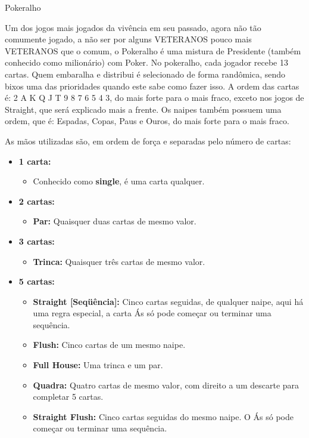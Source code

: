 \begin{subsecao}{Pokeralho}

Um dos jogos mais jogados da vivência em seu passado, agora não tão comumente
jogado, a não ser por alguns VETERANOS pouco mais VETERANOS que o comum, o
Pokeralho é uma mistura de Presidente (também conhecido como milionário) com
Poker. No pokeralho, cada jogador recebe 13 cartas. Quem embaralha e distribui é
selecionado de forma randômica, sendo bixos uma das prioridades quando este sabe
como fazer isso. A ordem das cartas é: 2 A K Q J T 9 8 7 6 5 4 3, do mais forte
para o mais fraco, exceto nos jogos de Straight, que será explicado mais a
frente. Os naipes também possuem uma ordem, que é: Espadas, Copas, Paus e Ouros,
do mais forte para o mais fraco.

As mãos utilizadas são, em ordem de força e separadas pelo número de cartas:
\begin{itemize}

\item \textbf {1 carta:}
\begin{itemize}
\item Conhecido como \textbf{single}, é uma carta qualquer.
\end{itemize}
\item \textbf {2 cartas:}
\begin{itemize}

\item \textbf{Par:} Quaisquer duas cartas de mesmo valor.
\end{itemize}
\item \textbf {3 cartas:}

\begin{itemize}
\item \textbf{Trinca:} Quaisquer três cartas de mesmo valor.
\end{itemize}
\item \textbf {5 cartas:}

\begin{itemize}
\item \textbf{Straight [Seqüência]:} Cinco cartas seguidas, de qualquer naipe,
aqui há uma regra especial, a carta Ás só pode começar ou terminar uma
sequência.
\item \textbf{Flush:} Cinco cartas de um mesmo naipe.
\item \textbf{Full House:} Uma trinca e um par.
\item \textbf{Quadra:} Quatro cartas de mesmo valor, com direito a um descarte
para completar 5 cartas.
\item \textbf{Straight Flush:} Cinco cartas seguidas do mesmo naipe. O Ás só
pode começar ou terminar uma sequência. 
\end{itemize}


\end{itemize}
\end{subsecao}
